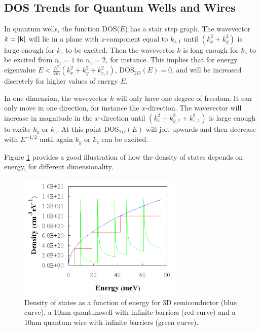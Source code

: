 \documentclass[11pt]{amsart}
\begin{document}
\subsection{DOS Trends for Quantum Wells and Wires}
In quantum wells, the function DOS($E$) has a stair step graph. The wavevector $k = \abs{\vb{k}}$ will lie in a plane with $z$-component equal to $k_{z,1}$ until $(k_x^2+k_y^2)$ is large enough for $k_z$ to be excited. Then the wavevector $k$ is long enough for $k_z$ to be excited from $n_z=1$ to $n_z=2$, for instance. This implies that for energy eigenvalue $E < \frac{\hbar^2}{2m}(k_x^2 + k_y^2 + k_{z,1}^2)$, DOS$_{2D}(E) =0$, and will be increased discretely for higher values of energy $E$.

In one dimension, the wavevector $k$ will only have one degree of freedom. It can only move in one direction, for instance the $x$-direction. The wavevector will increase in magnitude in the $x$-direction until $(k_x^2+k_{y,1}^2+k_{z,1}^2)$ is large enough to excite $k_y$ or $k_z$. At this point DOS$_{1D}(E)$ will jolt upwards and then decrease with $E^{-1/2}$ until again $k_y$ or $k_z$ can be excited.

Figure \ref{fig:dimensionalDOS} provides a good illustration of how the density of states depends on energy, for different dimensionality.

\begin{figure}
\centering
	\includegraphics[width=0.7\textwidth]{DOS.png}
	\caption{Density of states as a function of energy for 3D semiconductor (blue curve), a 10nm quantumwell with infinite barriers (red curve) and a 10nm quantum wire with infinite barriers (green curve).}
	\label{fig:dimensionalDOS}
\end{figure}
\end{document}
